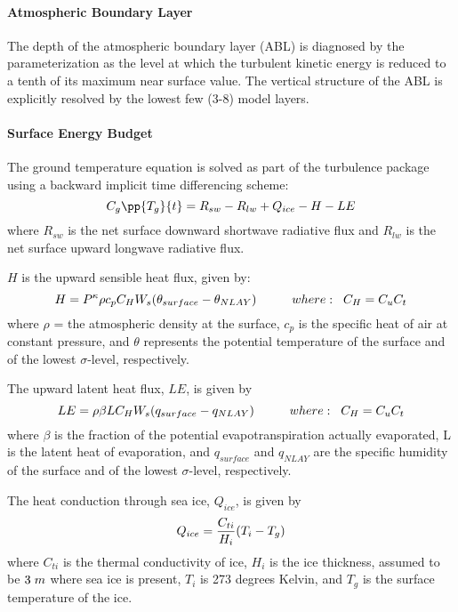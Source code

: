 \paragraph{Atmospheric Boundary Layer}

The depth of the atmospheric boundary layer (ABL) is diagnosed by the parameterization as the
level at which the turbulent kinetic energy is reduced to a tenth of its maximum near surface value.
The vertical structure of the ABL is explicitly resolved by the lowest few (3-8) model layers.

\paragraph{Surface Energy Budget}

The ground temperature equation is solved as part of the turbulence package
using a backward implicit time differencing scheme:
\[
C_g\pp{T_g}{t} = R_{sw} - R_{lw} + Q_{ice} - H - LE
\]
where $R_{sw}$ is the net surface downward shortwave radiative flux and $R_{lw}$ is the
net surface upward longwave radiative flux. 

$H$ is the upward sensible heat flux, given by:
\[
{H} =  P^{\kappa}\rho c_{p} C_{H} W_s (\theta_{surface} - \theta_{NLAY})
\hspace{1cm}where: \hspace{.2cm}C_H = C_u C_t
\]
where $\rho$ = the atmospheric density at the surface, $c_{p}$ is the specific
heat of air at constant pressure, and $\theta$ represents the potential temperature
of the surface and of the lowest $\sigma$-level, respectively.
 
The upward latent heat flux, $LE$, is given by
\[
{LE} =  \rho \beta L C_{H} W_s (q_{surface} - q_{NLAY})
\hspace{1cm}where: \hspace{.2cm}C_H = C_u C_t
\]
where $\beta$ is the fraction of the potential evapotranspiration actually evaporated,
L is the latent heat of evaporation, and $q_{surface}$ and $q_{NLAY}$ are the specific
humidity of the surface and of the lowest $\sigma$-level, respectively.

The heat conduction through sea ice, $Q_{ice}$, is given by
\[
{Q_{ice}} = {C_{ti} \over {H_i}} (T_i-T_g)
\]
where $C_{ti}$ is the thermal conductivity of ice, $H_i$ is the ice thickness, assumed to
be $3 \hspace{.1cm} m$ where sea ice is present, $T_i$ is 273 degrees Kelvin, and $T_g$ is the 
surface temperature of the ice.

